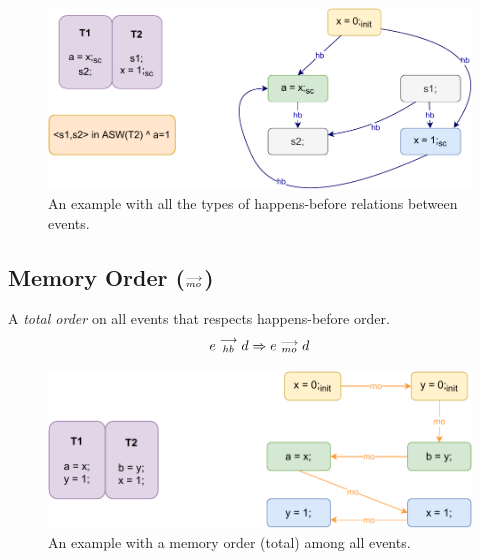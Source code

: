         \begin{figure}[H]
            \centering
            \includegraphics[scale=0.7]{4.ECMAScriptMemoryModel/Happens-before.pdf}
            \caption{An example with all the types of happens-before relations between events.}
        \end{figure}
    
    \subsection{Memory Order ($\stackrel{\longrightarrow}{_{mo}}$)}
        A \textit{total order} on all events that respects happens-before order. 
        \begin{align*}
            e\stackrel{\longrightarrow}{_{hb}}d \Rightarrow{} e\stackrel{\longrightarrow}{_{mo}}d    
        \end{align*}
        
        \begin{figure}[H]
            \centering
            \includegraphics[scale=0.7]{4.ECMAScriptMemoryModel/MemoryOrder.pdf}
            \caption{An example with a memory order (total) among all events.}
        \end{figure}

